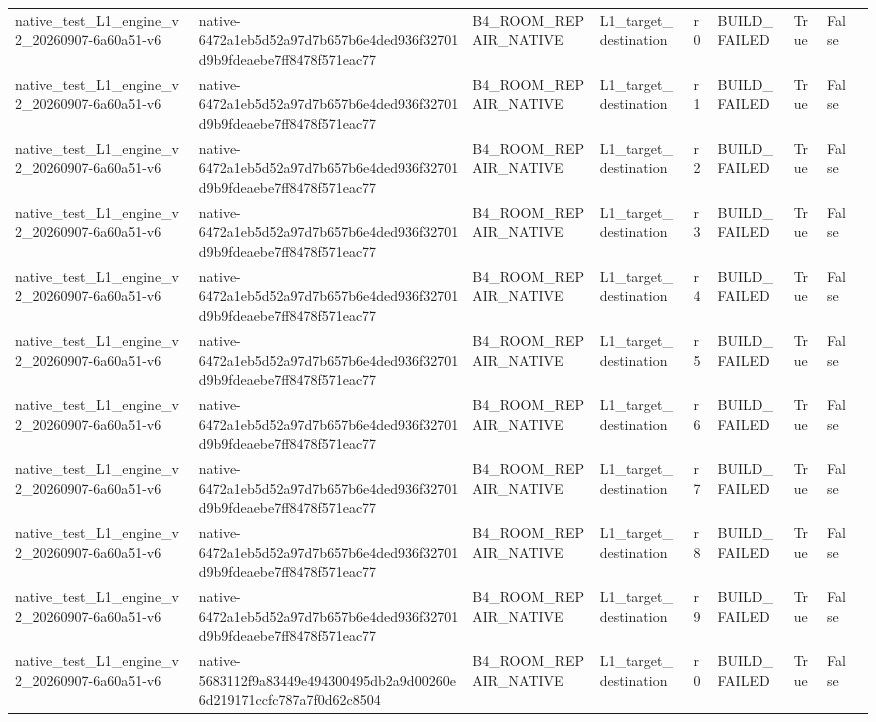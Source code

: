 \begin{tabular}{lllllllll}
native\_test\_L1\_engine\_v2\_20260907-6a60a51-v6 & native-6472a1eb5d52a97d7b657b6e4ded936f32701d9b9fdeaebe7ff8478f571eac77 & B4\_ROOM\_REPAIR\_NATIVE & L1\_target\_destination & r0 & BUILD\_FAILED & True & False &  \\
native\_test\_L1\_engine\_v2\_20260907-6a60a51-v6 & native-6472a1eb5d52a97d7b657b6e4ded936f32701d9b9fdeaebe7ff8478f571eac77 & B4\_ROOM\_REPAIR\_NATIVE & L1\_target\_destination & r1 & BUILD\_FAILED & True & False &  \\
native\_test\_L1\_engine\_v2\_20260907-6a60a51-v6 & native-6472a1eb5d52a97d7b657b6e4ded936f32701d9b9fdeaebe7ff8478f571eac77 & B4\_ROOM\_REPAIR\_NATIVE & L1\_target\_destination & r2 & BUILD\_FAILED & True & False &  \\
native\_test\_L1\_engine\_v2\_20260907-6a60a51-v6 & native-6472a1eb5d52a97d7b657b6e4ded936f32701d9b9fdeaebe7ff8478f571eac77 & B4\_ROOM\_REPAIR\_NATIVE & L1\_target\_destination & r3 & BUILD\_FAILED & True & False &  \\
native\_test\_L1\_engine\_v2\_20260907-6a60a51-v6 & native-6472a1eb5d52a97d7b657b6e4ded936f32701d9b9fdeaebe7ff8478f571eac77 & B4\_ROOM\_REPAIR\_NATIVE & L1\_target\_destination & r4 & BUILD\_FAILED & True & False &  \\
native\_test\_L1\_engine\_v2\_20260907-6a60a51-v6 & native-6472a1eb5d52a97d7b657b6e4ded936f32701d9b9fdeaebe7ff8478f571eac77 & B4\_ROOM\_REPAIR\_NATIVE & L1\_target\_destination & r5 & BUILD\_FAILED & True & False &  \\
native\_test\_L1\_engine\_v2\_20260907-6a60a51-v6 & native-6472a1eb5d52a97d7b657b6e4ded936f32701d9b9fdeaebe7ff8478f571eac77 & B4\_ROOM\_REPAIR\_NATIVE & L1\_target\_destination & r6 & BUILD\_FAILED & True & False &  \\
native\_test\_L1\_engine\_v2\_20260907-6a60a51-v6 & native-6472a1eb5d52a97d7b657b6e4ded936f32701d9b9fdeaebe7ff8478f571eac77 & B4\_ROOM\_REPAIR\_NATIVE & L1\_target\_destination & r7 & BUILD\_FAILED & True & False &  \\
native\_test\_L1\_engine\_v2\_20260907-6a60a51-v6 & native-6472a1eb5d52a97d7b657b6e4ded936f32701d9b9fdeaebe7ff8478f571eac77 & B4\_ROOM\_REPAIR\_NATIVE & L1\_target\_destination & r8 & BUILD\_FAILED & True & False &  \\
native\_test\_L1\_engine\_v2\_20260907-6a60a51-v6 & native-6472a1eb5d52a97d7b657b6e4ded936f32701d9b9fdeaebe7ff8478f571eac77 & B4\_ROOM\_REPAIR\_NATIVE & L1\_target\_destination & r9 & BUILD\_FAILED & True & False &  \\
native\_test\_L1\_engine\_v2\_20260907-6a60a51-v6 & native-5683112f9a83449e494300495db2a9d00260e6d219171ccfc787a7f0d62c8504 & B4\_ROOM\_REPAIR\_NATIVE & L1\_target\_destination & r0 & BUILD\_FAILED & True & False &  \\

\end{tabular}
